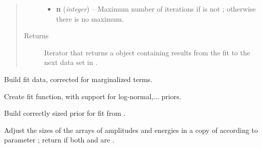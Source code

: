\documentclass[letterpaper,10pt,english]{sphinxmanual}
\begin{document}
\begin{fulllineitems}
\begin{fulllineitems}
\begin{quote}
\begin{description}
\begin{itemize}
\item {} 
\textbf{n} (\emph{integer}) -- Maximum number of iterations if  is not ;
otherwise there is no maximum.

\end{itemize}

\item[{Returns}] \leavevmode
Iterator that returns a  object 
containing results from the fit to the next data set in
.

\end{description}\end{quote}

\end{fulllineitems}


\begin{fulllineitems}
\label{corrfitter:corrfitter.CorrFitter.builddata}
Build fit data, corrected for marginalized terms.

\end{fulllineitems}


\begin{fulllineitems}
\label{corrfitter:corrfitter.CorrFitter.buildfitfcn}
Create fit function, with support for log-normal,... priors.

\end{fulllineitems}


\begin{fulllineitems}
\label{corrfitter:corrfitter.CorrFitter.buildprior}
Build correctly sized prior for fit from .

Adjust the sizes of the arrays of  amplitudes and energies in
a copy of  according to  parameter ; return
 if both  and  are .

\end{fulllineitems}



\end{fulllineitems}
\end{document}

